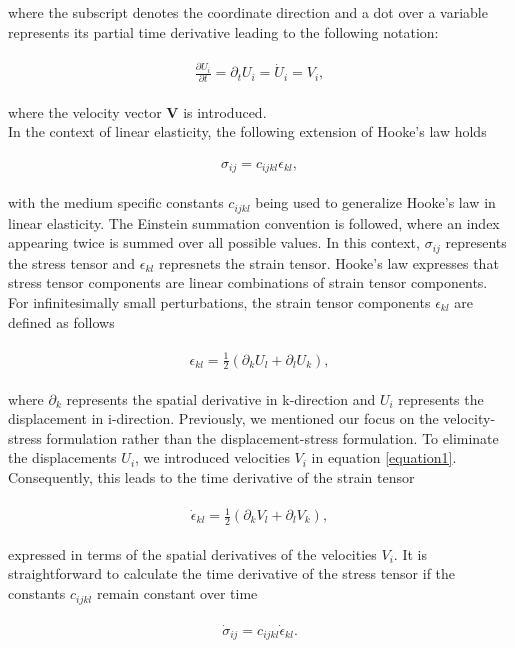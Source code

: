 where the subscript denotes the coordinate direction and a dot over a variable represents its partial time derivative leading to the following notation:

\begin{align}
    \begin{split}
        \frac{\partial U_i}{\partial t} = \partial_t U_i = \dot{U}_i = V_i,
    \end{split}
    \label{equation1}
\end{align}

where the velocity vector \textbf{V} is introduced. \\

In the context of linear elasticity, the following extension of Hooke's law holds

\begin{align}
    \begin{split}
        \sigma_{ij} = c_{ijkl}\epsilon_{kl},
    \end{split}
\end{align}

with the medium specific constants $c_{ijkl}$ being used to generalize Hooke's law in linear elasticity. The Einstein summation convention
is followed, where an index appearing twice is summed over all possible values. In this context, $\sigma_{ij}$ represents the stress tensor
and $\epsilon_{kl}$ represnets the strain tensor. Hooke's law expresses that stress tensor components are linear combinations of strain tensor
components. For infinitesimally small perturbations, the strain tensor components $\epsilon_{kl}$ are defined as follows

\begin{align}
    \begin{split}
        \epsilon_{kl} = \frac{1}{2}\left(\partial_k U_l + \partial_l U_k \right) ,
    \end{split}
\end{align}

where $\partial_k$ represents the spatial derivative in k-direction and $U_i$ represents the displacement in i-direction.
Previously, we mentioned our focus on the velocity-stress formulation rather than the displacement-stress formulation.
To eliminate the displacements $U_i$, we introduced velocities $V_i$ in equation \ref{equation1}.
Consequently, this leads to the time derivative of the strain tensor

\begin{align}
    \begin{split}
        \dot{\epsilon}_{kl} = \frac{1}{2}\left( \partial_k V_l + \partial_l V_k \right) ,
    \end{split}
\end{align}

expressed in terms of the spatial derivatives of the velocities $V_i$. It is straightforward to calculate the time derivative
of the stress tensor if the constants $c_{ijkl}$ remain constant over time

\begin{align}
    \begin{split}
        \dot{\sigma}_{ij} = c_{ijkl}\dot{\epsilon}_{kl} .
    \end{split}
\end{align}